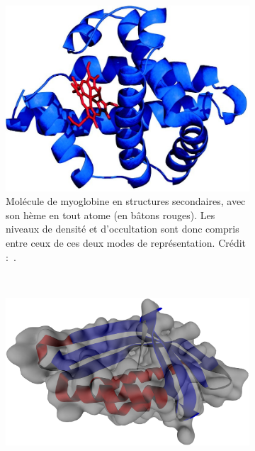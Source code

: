 \begin{appendices}
	
	\begin{figure}[!htbp]
		\begin{subfigure}[t]{0.40\textwidth}
			\centering
			\includegraphics[width=\textwidth]{figures/ch1/myoglobin}
			\caption[Représentation hybride d'une protéine]{Molécule de myoglobine en  structures secondaires, avec son hème en \og tout atome \fg{} (en bâtons rouges). Les niveaux de densité et d'occultation sont donc compris entre ceux de ces deux modes de représentation. Crédit :~\cite{Ordway3441}.}
			\label{fig:myoglobin}
		\end{subfigure}
		~
		\begin{subfigure}[t]{0.58\textwidth}
			\centering
			\includegraphics[width=\textwidth]{figures/ch1/transSS}

\end{subfigure}
\end{figure}
\end{appendices}
